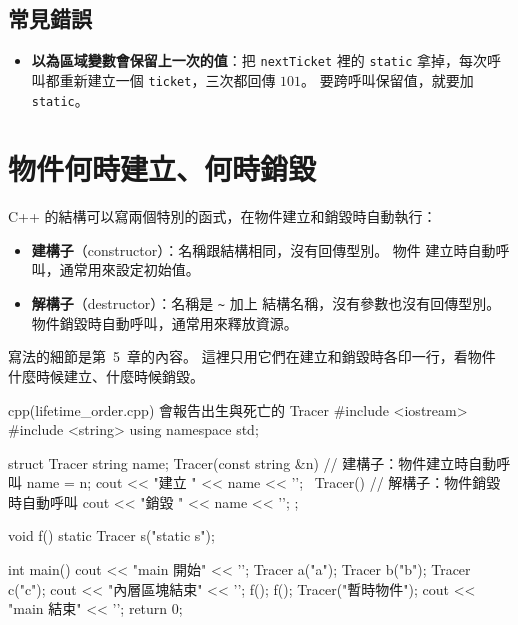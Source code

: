 \subsection{常見錯誤}

\begin{itemize}
\item \textbf{以為區域變數會保留上一次的值}：把 \texttt{nextTicket} 裡的
\texttt{static} 拿掉，每次呼叫都重新建立一個 \texttt{ticket}，三次都回傳
$101$。 要跨呼叫保留值，就要加 \texttt{static}。
\end{itemize}

\section{物件何時建立、何時銷毀}
\label{sec:ctor-dtor}

C++ 的結構可以寫兩個特別的函式，在物件建立和銷毀時自動執行：

\begin{itemize}
\item \textbf{建構子}（constructor）：名稱跟結構相同，沒有回傳型別。 物件
建立時自動呼叫，通常用來設定初始值。
\item \textbf{解構子}（destructor）：名稱是 \texttt{\textasciitilde} 加上
結構名稱，沒有參數也沒有回傳型別。 物件銷毀時自動呼叫，通常用來釋放資源。
\end{itemize}

寫法的細節是第~5~章的內容。 這裡只用它們在建立和銷毀時各印一行，看物件
什麼時候建立、什麼時候銷毀。

\begin{example}[label=ex:lifetime-order]{cpp}{(lifetime\_order.cpp) 會報告出生與死亡的 Tracer}
#include <iostream>
#include <string>
using namespace std;

struct Tracer {
    string name;
    Tracer(const string &n) {      // 建構子：物件建立時自動呼叫
        name = n;
        cout << "建立 " << name << '\n';
    }
    ~Tracer() {                    // 解構子：物件銷毀時自動呼叫
        cout << "銷毀 " << name << '\n';
    }
};

void f() {
    static Tracer s("static s");
}

int main() {
    cout << "main 開始" << '\n';
    Tracer a("a");
    {
        Tracer b("b");
        Tracer c("c");
        cout << "內層區塊結束" << '\n';
    }
    f();
    f();
    Tracer("暫時物件");
    cout << "main 結束" << '\n';
    return 0;
}
\end{example}


